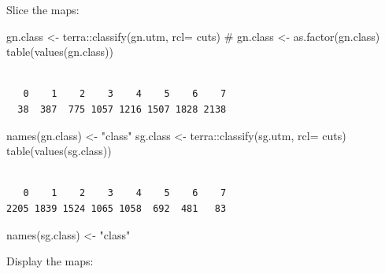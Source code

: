 \documentclass[
  letterpaper,
  DIV=11,
  numbers=noendperiod]{scrartcl}
\newenvironment{Shaded}{\begin{snugshade}}{\end{snugshade}}
\newcommand{\AttributeTok}[1]{\textcolor[rgb]{0.40,0.45,0.13}{#1}}
\newcommand{\CommentTok}[1]{\textcolor[rgb]{0.37,0.37,0.37}{#1}}
\newcommand{\FunctionTok}[1]{\textcolor[rgb]{0.28,0.35,0.67}{#1}}
\newcommand{\NormalTok}[1]{\textcolor[rgb]{0.00,0.23,0.31}{#1}}
\newcommand{\OtherTok}[1]{\textcolor[rgb]{0.00,0.23,0.31}{#1}}
\newcommand{\SpecialCharTok}[1]{\textcolor[rgb]{0.37,0.37,0.37}{#1}}
\newcommand{\StringTok}[1]{\textcolor[rgb]{0.13,0.47,0.30}{#1}}
\begin{document}
Slice the maps:

\begin{Shaded}
\begin{Highlighting}[]
\NormalTok{gn.class }\OtherTok{\textless{}{-}}\NormalTok{ terra}\SpecialCharTok{::}\FunctionTok{classify}\NormalTok{(gn.utm, }\AttributeTok{rcl=}\NormalTok{ cuts)}
\CommentTok{\# gn.class \textless{}{-} as.factor(gn.class)}
\FunctionTok{table}\NormalTok{(}\FunctionTok{values}\NormalTok{(gn.class))}
\end{Highlighting}
\end{Shaded}

\begin{verbatim}

   0    1    2    3    4    5    6    7 
  38  387  775 1057 1216 1507 1828 2138 
\end{verbatim}

\begin{Shaded}
\begin{Highlighting}[]
\FunctionTok{names}\NormalTok{(gn.class) }\OtherTok{\textless{}{-}} \StringTok{"class"}
\NormalTok{sg.class }\OtherTok{\textless{}{-}}\NormalTok{ terra}\SpecialCharTok{::}\FunctionTok{classify}\NormalTok{(sg.utm, }\AttributeTok{rcl=}\NormalTok{ cuts)}
\FunctionTok{table}\NormalTok{(}\FunctionTok{values}\NormalTok{(sg.class))}
\end{Highlighting}
\end{Shaded}

\begin{verbatim}

   0    1    2    3    4    5    6    7 
2205 1839 1524 1065 1058  692  481   83 
\end{verbatim}

\begin{Shaded}
\begin{Highlighting}[]
\FunctionTok{names}\NormalTok{(sg.class) }\OtherTok{\textless{}{-}} \StringTok{"class"}
\end{Highlighting}
\end{Shaded}

Display the maps:
\end{document}
